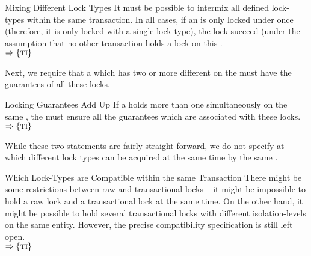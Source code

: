 \documentclass[a4paper, 12pt]{book}
\newcommand{\INTERFACE}[1]{$\Rightarrow\left\{#1\right\}$}
\begin{document}
\begin{requirement*}{Mixing Different Lock Types}
  It must be possible to intermix all defined lock-types within the
  same transaction. In all cases, if an  is only locked
  under once (therefore, it is only locked with a single lock type),
  the lock succeed (under the assumption that no other transaction
  holds a lock on this .\\
  \INTERFACE{\TRANSACTION}
\end{requirement*}
%
Next, we require that a  which has two or more
different  on the  must have the guarantees of
all these locks.
%
\begin{requirement*}{Locking Guarantees Add Up}
  If a  holds more than one  simultaneously
  on the same , the \SYNEIGHT must ensure all the
  guarantees which are associated with these locks.\\
  \INTERFACE{\TRANSACTION}
\end{requirement*}
%
While these two statements are fairly straight forward, we do not
specify at which different lock types can be acquired at the same
time by the same . 
%
\begin{question*}{Which Lock-Types are Compatible within the same Transaction}
  There might be some restrictions between raw and transactional
  locks -- it might be impossible to hold a raw lock and a
  transactional lock at the same time. On the other hand, it might be
  possible to hold several transactional locks with different
  isolation-levels on the same entity.
  However, the precise compatibility specification is still left
  open.\\
  \INTERFACE{\TRANSACTION}
\end{question*}
\end{document}
